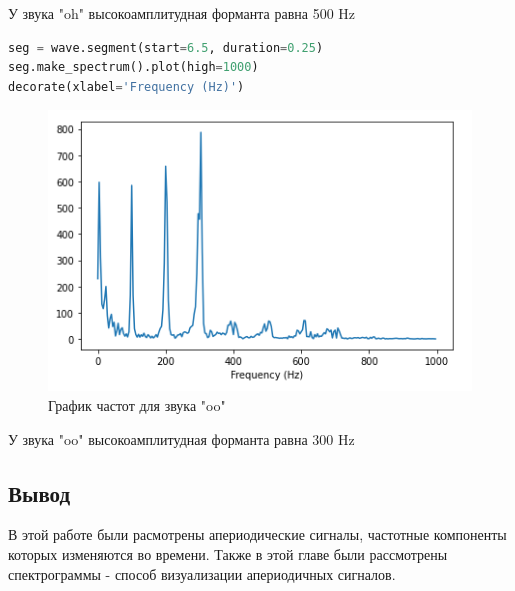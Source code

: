 У звука "oh" высокоамплитудная форманта равна 500 Hz

\begin{lstlisting}[language=Python]
seg = wave.segment(start=6.5, duration=0.25)
seg.make_spectrum().plot(high=1000)
decorate(xlabel='Frequency (Hz)')
\end{lstlisting}

\begin{figure}[H]
	\begin{center}
		\includegraphics[scale=1]{fig/lab03/lab03_19.png}
		\caption{График частот для звука "oo"}
	\end{center}
\end{figure}

У звука "oo" высокоамплитудная форманта равна 300 Hz


\subsection{Вывод}

В этой работе были расмотрены апериодические сигналы, частотные компоненты которых изменяются во времени. Также в этой главе были рассмотрены спектрограммы - способ визуализации апериодичных сигналов.
